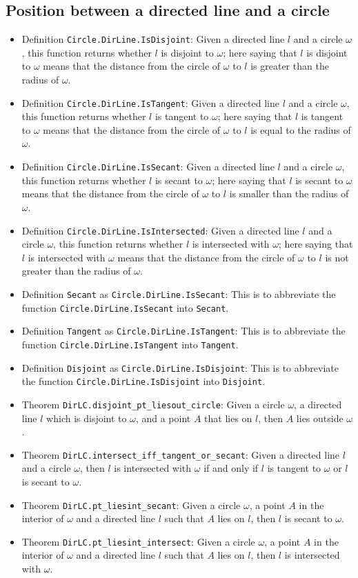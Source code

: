\documentclass[12pt]{amsart}
\begin{document}
\subsection{Position between a directed line and a circle}
\begin{itemize}
    \item Definition \verb|Circle.DirLine.IsDisjoint|: Given a directed line $l$ and a circle $\omega$, this function returns whether $l$ is disjoint to $\omega$; here saying that $l$ is disjoint to $\omega$ means that the distance from the circle of $\omega$ to $l$ is greater than the radius of $\omega$.
    \item Definition \verb|Circle.DirLine.IsTangent|: Given a directed line $l$ and a circle $\omega$, this function returns whether $l$ is tangent to $\omega$; here saying that $l$ is tangent to $\omega$ means that the distance from the circle of $\omega$ to $l$ is equal to the radius of $\omega$.
    \item Definition \verb|Circle.DirLine.IsSecant|: Given a directed line $l$ and a circle $\omega$, this function returns whether $l$ is secant to $\omega$; here saying that $l$ is secant to $\omega$ means that the distance from the circle of $\omega$ to $l$ is smaller than the radius of $\omega$.
    \item Definition \verb|Circle.DirLine.IsIntersected|: Given a directed line $l$ and a circle $\omega$, this function returns whether $l$ is intersected with $\omega$; here saying that $l$ is intersected with $\omega$ means that the distance from the circle of $\omega$ to $l$ is not greater than the radius of $\omega$.
    \item Definition \verb|Secant| as \verb|Circle.DirLine.IsSecant|: This is to abbreviate the function \verb|Circle.DirLine.IsSecant| into \verb|Secant|.
    \item Definition \verb|Tangent| as \verb|Circle.DirLine.IsTangent|: This is to abbreviate the function \verb|Circle.DirLine.IsTangent| into \verb|Tangent|.
    \item Definition \verb|Disjoint| as \verb|Circle.DirLine.IsDisjoint|: This is to abbreviate the function \verb|Circle.DirLine.IsDisjoint| into \verb|Disjoint|.
    \item Theorem \verb|DirLC.disjoint_pt_liesout_circle|: Given a circle $\omega$, a directed line $l$ which is disjoint to $\omega$, and a point $A$ that lies on $l$, then $A$ lies outside $\omega$.
    \item Theorem \verb|DirLC.intersect_iff_tangent_or_secant|: Given a directed line $l$ and a circle $\omega$, then $l$ is intersected with $\omega$ if and only if $l$ is tangent to $\omega$ or $l$ is secant to $\omega$.
    \item Theorem \verb|DirLC.pt_liesint_secant|: Given a circle $\omega$, a point $A$ in the interior of $\omega$ and a directed line $l$ such that $A$ lies on $l$, then $l$ is secant to $\omega$.
    \item Theorem \verb|DirLC.pt_liesint_intersect|: Given a circle $\omega$, a point $A$ in the interior of $\omega$ and a directed line $l$ such that $A$ lies on $l$, then $l$ is intersected with $\omega$.
\end{itemize}
\end{document}

